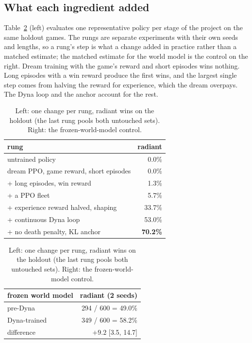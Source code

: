 \documentclass[11pt]{article}
\begin{document}
\subsection{What each ingredient added}

Table~\ref{tab:ladder} (left) evaluates one representative policy per stage of the project on the same holdout games. The rungs are separate experiments with their own seeds and lengths, so a rung's step is what a change added in practice rather than a matched estimate; the matched estimate for the world model is the control on the right. Dream training with the game's reward and short episodes wins nothing. Long episodes with a win reward produce the first wins, and the largest single step comes from halving the reward for experience, which the dream overpays. The Dyna loop and the anchor account for the rest.

\begin{table}[!htbp]
\centering\small
\caption{Left: one change per rung, radiant wins on the holdout (the last rung pools both untouched sets). Right: the frozen-world-model control.}
\label{tab:ladder}
\begin{minipage}{0.55\linewidth}\centering
\begin{tabular}{l r}
\toprule
rung & radiant \\
\midrule
untrained policy & 0.0\% \\
dream PPO, game reward, short episodes & 0.0\% \\
+ long episodes, win reward & 1.3\% \\
+ a PPO fleet & 5.7\% \\
+ experience reward halved, shaping & 33.7\% \\
+ continuous Dyna loop & 53.0\% \\
+ no death penalty, KL anchor & \textbf{70.2\%} \\
\bottomrule
\end{tabular}
\end{minipage}\hfill
\begin{minipage}{0.42\linewidth}\centering
\begin{tabular}{l r}
\toprule
frozen world model & radiant (2 seeds) \\
\midrule
pre-Dyna & 294 / 600 = 49.0\% \\
Dyna-trained & 349 / 600 = 58.2\% \\
\midrule
difference & $+9.2$ [3.5, 14.7] \\
\bottomrule
\end{tabular}
\end{minipage}
\end{table}
\end{document}
